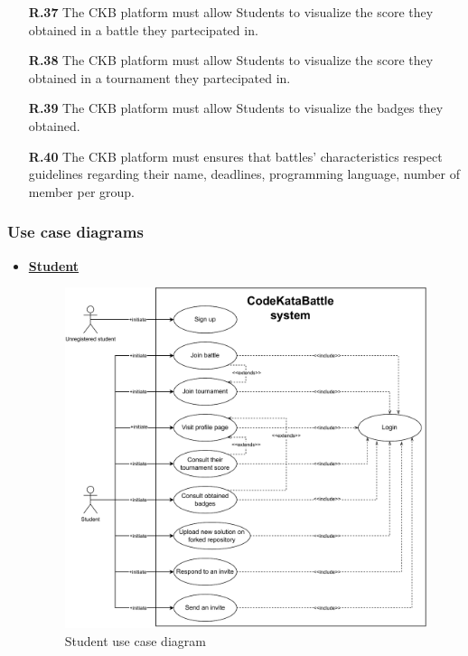 \documentclass{article}
\begin{document}
{\begin{itemize}
            \item[\textbf{R.37}] The CKB platform must allow Students to visualize the score they obtained in a battle they partecipated in.
            \item[\textbf{R.38}] The CKB platform must allow Students to visualize the score they obtained in a tournament they partecipated in.
            \item[\textbf{R.39}] The CKB platform must allow Students to visualize the badges they obtained.  
            \item[\textbf{R.40}] The CKB platform must ensures that battles' characteristics respect guidelines
            regarding their name, deadlines, programming language, number of member per group.
        \end{itemize}
    \subsubsection{Use case diagrams}
            \begin{itemize}
                \item \underline{\large{\textbf{Student}}}
                    \begin{figure}[H]
                        \centering
                        \includegraphics[scale=0.55]{images/3.2.2_UseCaseDiagrams/CaseDiagramStudent.pdf}
                        \caption{Student use case diagram}
                        \label{fig:studentUseCaseDiagram}
                    \end{figure}
                    

\end{itemize}}
\end{document}
